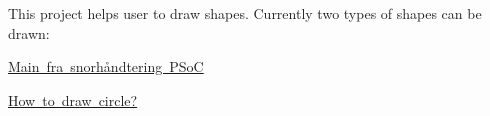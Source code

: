 This project helps user to draw shapes. Currently two types of shapes can be drawn\+:
\begin{DoxyItemize}
\item \mbox{\hyperlink{Snor}{Main fra snorhåndtering P\+SoC}}
\item \mbox{\hyperlink{drawingCirclePage}{How to draw circle?}} 
\end{DoxyItemize}